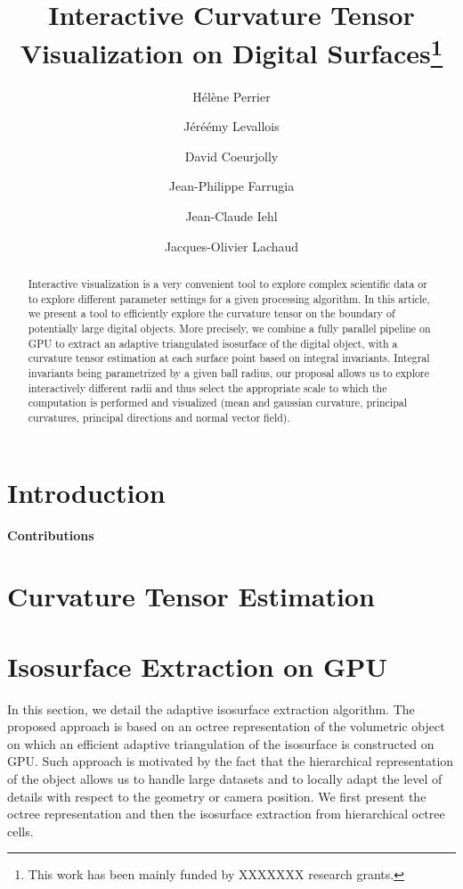 \documentclass{llncs}
\title{Interactive Curvature Tensor Visualization on Digital
Surfaces\thanks{This work has been mainly funded by XXXXXXX research grants.}}
\author{H\'el\`ene Perrier\inst{1}\and J\'eré\'emy Levallois\inst{1,2}\and David
Coeurjolly\inst{1}\and Jean-Philippe Farrugia\inst{1}\and Jean-Claude
Iehl\inst{1}\and Jacques-Olivier Lachaud\inst{2} }
\institute{ Universit\'e de Lyon, CNRS\\
   LIRIS, UMR5205, F-69621, France
   \and
Universit\'e de Savoie, CNRS\\
LAMA, UMR5127, F-73776, France\\
}
\begin{document}
\maketitle


\begin{abstract}\sloppy
  Interactive visualization is a very convenient tool to explore
  complex scientific data or to explore different parameter settings
  for a given processing algorithm. In this article, we present a tool
  to efficiently explore the curvature tensor on the boundary of
  potentially large digital objects. More precisely, we combine a
  fully parallel pipeline on GPU to extract an adaptive triangulated
  isosurface of the digital object, with a curvature tensor
  estimation at each surface point based on integral
  invariants. Integral invariants being parametrized by a given ball
  radius, our proposal allows us to explore interactively different
  radii and thus select the appropriate scale to which the computation
  is performed and visualized (mean and gaussian curvature, principal
  curvatures, principal directions and normal vector field).


\end{abstract}

\section{Introduction}
\label{sec:introduction}



\textbf{Contributions}




\section{Curvature Tensor Estimation}
\label{sec:curv-tens-estim}


\section{Isosurface Extraction on GPU}
\label{sec:isos-extr-gpu}

In this section, we detail the adaptive isosurface extraction
algorithm. The proposed approach is based on an octree representation
of the volumetric object on which an efficient adaptive triangulation
of the isosurface is constructed on GPU. Such approach is motivated by
the fact that the hierarchical representation of the object allows us
to handle large datasets and to locally adapt the level of details
with respect to the geometry or camera position. We first present the
octree representation and then the isosurface extraction from
hierarchical octree cells.
\end{document}
